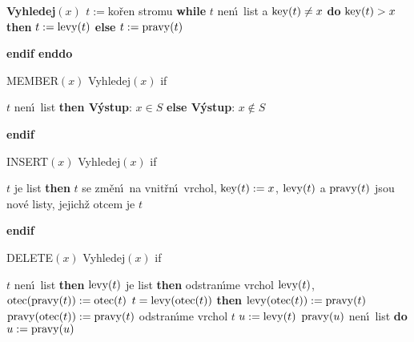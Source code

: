{\bf Vyhledej$(x)$\newline 
$t:=$}ko\v ren stromu\newline 
{\bf while} $t$ nen\'\i\ list a $\operatorname{key}(t)\ne x$ {\bf do}\newline 
\phantom{---}{\bf if} $\operatorname{key}(t)>x$ {\bf then} $t:=\operatorname{levy}(t)$ {\bf else} $t:=\operatorname{pravy}(t)$ {\bf endif\newline 
enddo
\medskip

MEMBER$(x)$\newline 
Vyhledej$(x)$\newline 
if} $t$ nen\'\i\ list {\bf then V\'ystup}: $x\in S$ {\bf else V\'ystup}: $
x\notin S$ {\bf endif
\medskip

INSERT$(x)$\newline 
Vyhledej$(x)$\newline 
if} $t$ je list {\bf then}\newline 
$t$ se zm\v en\'\i\ na vnit\v rn\'\i\ vrchol, $\operatorname{key}(t):=x$,\newline 
$\operatorname{levy}(t)$ a $\operatorname{pravy}(t)$ jsou nov\'e listy, jejich\v z otcem je $t$\newline 
{\bf endif
\medskip

DELETE$(x)$\newline 
Vyhledej$(x)$\newline 
if} $t$ nen\'\i\ list {\bf then}\newline 
\phantom{---}{\bf if} $\operatorname{levy}(t)$ je list {\bf then\newline}
\phantom{------}odstran\'\i me vrchol $\operatorname{levy}(t)$, $\operatorname{otec}(\operatorname{pravy}(t)):=\operatorname{otec}(t)$\newline 
\phantom{------}{\bf if} $t=\operatorname{levy}(\operatorname{otec}(t))$ {\bf then}\newline
\phantom{---------}$\operatorname{levy}(\operatorname{otec}(t)):=\operatorname{pravy}(t)$\newline 
\phantom{------}{\bf else}\newline 
\phantom{---------}$\operatorname{pravy}(\operatorname{otec}(t)):=\operatorname{pravy}(t)$\newline 
\phantom{------}{\bf endif\newline}
\phantom{------}odstran\'\i me vrchol $t$\newline 
\phantom{---}{\bf else}\newline 
\phantom{------}$u:=\operatorname{levy}(t)$\newline 
\phantom{------}{\bf while} $\operatorname{pravy}(u)$ nen\'\i\ list {\bf do}\newline \phantom{---------}$u:=\operatorname{pravy}(u)$\newline 
\phantom{------}{\bf enddo}\newline 
